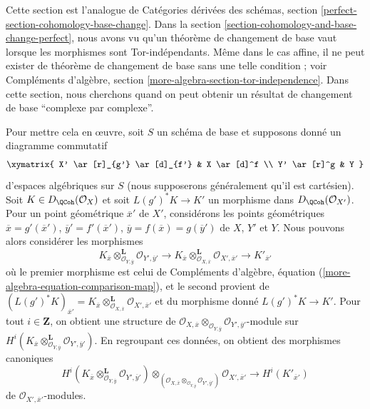 \noindent
Cette section est l'analogue de Catégories dérivées des schémas, section
\ref{perfect-section-cohomology-base-change}. Dans la
section \ref{section-cohomology-and-base-change-perfect},
nous avons vu qu'un théorème de changement de base vaut lorsque les morphismes sont Tor-indépendants.
Même dans le cas affine, il ne peut exister de théorème de changement de base sans une telle
condition ; voir
Compléments d'algèbre, section \ref{more-algebra-section-tor-independence}.
Dans cette section, nous cherchons quand on peut obtenir un résultat de changement de base
``complexe par complexe''.

\medskip\noindent
Pour mettre cela en œuvre, soit $S$ un schéma de base et
supposons donné un diagramme commutatif
$$
\xymatrix{
X' \ar[r]_{g'} \ar[d]_{f'} &
X \ar[d]^f \\
Y' \ar[r]^g &
Y
}
$$
d'espaces algébriques sur $S$ (nous supposerons généralement qu'il est cartésien).
Soit $K \in D_\QCoh(\mathcal{O}_X)$
et soit $L(g')^*K \to K'$ un morphisme dans $D_\QCoh(\mathcal{O}_{X'})$.
Pour un point géométrique $\overline{x}'$ de $X'$, considérons les points
géométriques
$\overline{x} = g'(\overline{x}')$,
$\overline{y}' = f'(\overline{x}')$,
$\overline{y} = f(\overline{x}) = g(\overline{y}')$
de $X$, $Y'$ et $Y$.
Nous pouvons alors considérer les morphismes
$$
K_{\overline{x}}
\otimes_{\mathcal{O}_{Y, \overline{y}}}^\mathbf{L}
\mathcal{O}_{Y', \overline{y}'}
\to
K_{\overline{x}}
\otimes_{\mathcal{O}_{X, \overline{x}}}^\mathbf{L}
\mathcal{O}_{X', \overline{x}'} \to
K'_{\overline{x}'}
$$
où le premier morphisme est celui de Compléments d'algèbre,
équation (\ref{more-algebra-equation-comparison-map}),
et le second provient de
$(L(g')^*K)_{\overline{x}'} =
K_{\overline{x}} \otimes_{\mathcal{O}_{X, \overline{x}}}^\mathbf{L}
\mathcal{O}_{X', \overline{x}'}$
et du morphisme donné $L(g')^*K \to K'$.
Pour tout $i \in \mathbf{Z}$, on obtient une structure de
$\mathcal{O}_{X, \overline{x}} \otimes_{\mathcal{O}_{Y, \overline{y}}}
\mathcal{O}_{Y', \overline{y}'}$-module sur
$H^i(K_{\overline{x}}
\otimes_{\mathcal{O}_{Y, \overline{y}}}^\mathbf{L}
\mathcal{O}_{Y', \overline{y}'})$.
En regroupant ces données, on obtient des morphismes canoniques
\begin{equation}
\label{equation-bc}
H^i(K_{\overline{x}}
\otimes_{\mathcal{O}_{Y, \overline{y}}}^\mathbf{L}
\mathcal{O}_{Y', \overline{y}'})
\otimes_{(\mathcal{O}_{X, \overline{x}}
\otimes_{\mathcal{O}_{Y, \overline{y}}}
\mathcal{O}_{Y', \overline{y}'})}
\mathcal{O}_{X', \overline{x}'}
\longrightarrow
H^i(K'_{\overline{x}'})
\end{equation}
de $\mathcal{O}_{X', \overline{x}'}$-modules.

